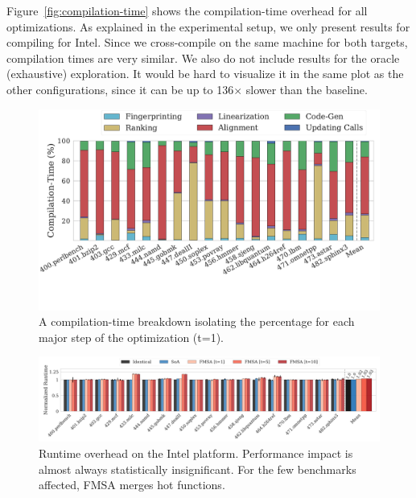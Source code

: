 Figure~\ref{fig:compilation-time} shows the compilation-time overhead for all
optimizations.
As explained in the experimental setup, we only present results for compiling
for Intel. Since we cross-compile on the same machine for both targets, compilation
times are very similar. We also do not include results for the oracle (exhaustive) exploration.
It would be hard to visualize it in the same plot as the other configurations, since it
can be up to 136$\times$ slower than the baseline.

\begin{figure}[t]
  \centering
  \includegraphics[width=1.0\linewidth]{figs/compilation-time-breakdown-sqrd.pdf}
  \vspace{-8.5ex}
  \caption{A compilation-time breakdown isolating the percentage for each major
           step of the optimization (t=1).}%
  \label{fig:compilation-time-breakdown}
\end{figure}

\begin{figure}[t]
  \centering
  \includegraphics[width=\linewidth]{figs/runtime-impact.pdf}
  \vspace{-4ex}
  \caption{Runtime overhead on the Intel platform. Performance impact is almost always statistically insignificant. For the few benchmarks affected, FMSA merges hot functions.}
  \label{fig:runtime-impact}
\end{figure}

